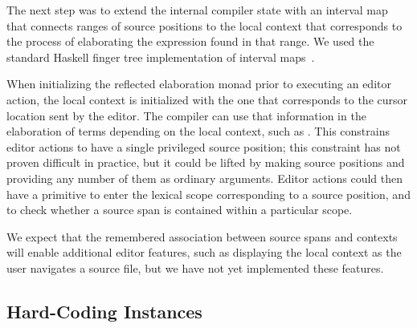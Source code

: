 The next step was to extend the internal compiler state with an
interval map that connects ranges of source positions to the local
context that corresponds to the process of elaborating the expression
found in that range. We used the standard Haskell finger tree
implementation of interval maps~\cite{fingertrees}.

When initializing the reflected elaboration monad prior to executing
an editor action, the local context is initialized with the one that
corresponds to the cursor location sent by the editor. The compiler
can use that information in the elaboration of terms depending on the
local context, such as . This constrains
editor actions to have a single privileged source position; this
constraint has not proven difficult in practice, but it could be
lifted by making source positions  and providing any
number of them as ordinary arguments. Editor actions could then have a
primitive to enter the lexical scope corresponding to a source
position, and to check whether a source span is contained within a
particular scope.

We expect that the remembered association between source spans and
contexts will enable additional editor features, such as displaying
the local context as the user navigates a source file, but we have not
yet implemented these features.

\subsection{Hard-Coding \Editorable{} Instances}

